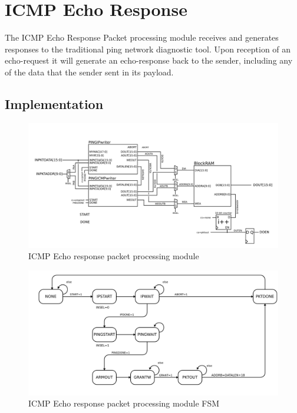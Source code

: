 \section{ICMP Echo Response}
The ICMP Echo Response Packet processing module receives and generates
responses to the traditional ping network diagnostic tool. Upon
reception of an echo-request it will generate an echo-response back to
the sender, including any of the data that the sender sent in its
payload.

\subsection{Implementation}
\begin{figure}
\begin{centering}
\includegraphics[scale=0.8]{ping.svg}
\end{centering}
\caption{ICMP Echo response packet processing module}
\label{ping}
\end{figure}

\begin{figure}
\begin{centering}
\includegraphics[scale=0.8]{ping.fsm.svg}
\end{centering}
\caption{ICMP Echo response packet processing module FSM}
\label{ping.fsm}
\end{figure}

